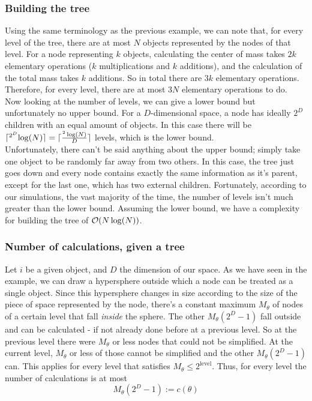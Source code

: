 \subsubsection*{Building the tree} 
Using the same terminology as the previous example, we can note that, for every level of the tree, there are at most $N$ objects represented by the nodes of that level. 
For a node representing $k$ objects, calculating the center of mass takes $2k$ elementary operations ($k$ multiplications and $k$ additions), and the calculation of the total mass takes $k$ additions. 
So in total there are $3k$ elementary operations. Therefore, for every level, there are at most $3N$ elementary operations to do.\\

Now looking at the number of levels, we can give a lower bound but unfortunately no upper bound. 
For a $D$-dimensional space, a node has ideally $2^D$ children with an equal amount of objects. 
In this case there will be $\lceil ^{2^D} \log(N) \rceil = \lceil \frac{^2\log(N)}{D} \rceil$ levels, which is the lower bound.\\

Unfortunately, there can't be said anything about the upper bound; simply take one object to be randomly far away from two others. 
In this case, the tree just goes down and every node contains exactly the same information as it's parent, except for the last one, which has two external children. 
Fortunately, according to our simulations, the vast majority of the time, the number of levels isn't much greater than the lower bound. 
Assuming the lower bound, we have a complexity for building the tree of $\mathcal{O}(N\log(N))$.

\subsubsection*{Number of calculations, given a tree} Let $i$ be a given object, and $D$ the dimension of our space. 
As we have seen in the example, we can draw a hypersphere outside which a node can be treated as a single object. 
Since this hypersphere changes in size according to the size of the piece of space represented by the node, there's a constant maximum $M_\theta$ of nodes of a certain level that fall \textit{inside} the sphere. 
The other $M_\theta(2^D-1)$ fall outside and can be calculated - if not already done before at a previous level. 
So at the previous level there were $M_\theta$ or less nodes that could not be simplified. 
At the current level, $M_\theta$ or less of those cannot be simplified and the other $M_\theta(2^D-1)$ can. 
This applies for every level that satisfies $M_\theta \leq 2^{\text{level}}$. 
Thus, for every level the number of calculations is at most
\[
M_\theta (2^D-1) := c(\theta)
\]

